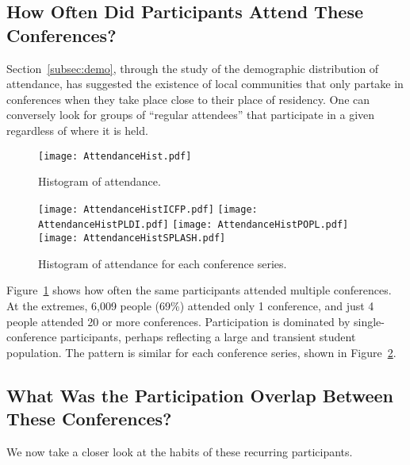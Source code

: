 \subsection{How Often Did Participants Attend These Conferences?}
\label{subsec:overlap}

Section~\ref{subsec:demo}, through the study of the demographic distribution of
attendance, has suggested the existence of local communities that only
partake in conferences when they take place close to their place of residency.
One can conversely look for groups of ``regular attendees'' that participate in
a given \conf regardless of where it is held.

\begin{figure}
  \centering
  \texttt{[image: AttendanceHist.pdf]}
  \caption{Histogram of attendance.}
  \label{fig:hist_attendance}
\end{figure}

\begin{figure}
  \centering
  \texttt{[image: AttendanceHistICFP.pdf]}
  \texttt{[image: AttendanceHistPLDI.pdf]}
  \texttt{[image: AttendanceHistPOPL.pdf]}
  \texttt{[image: AttendanceHistSPLASH.pdf]}
  \caption{Histogram of attendance for each conference series.}
  \label{fig:hist_attendance_per_conference}
\end{figure}

Figure~\ref{fig:hist_attendance} shows how often the same participants attended
multiple conferences. At the extremes, 6,009 people (69\%) attended only 1
conference, and just 4 people attended 20 or more conferences. Participation is
dominated by single-conference participants, perhaps reflecting a large and
transient student population. The pattern is similar for each conference series,
shown in Figure~\ref{fig:hist_attendance_per_conference}.


\subsection{What Was the Participation Overlap Between These Conferences?}

We now take a closer look at the habits of these recurring participants.

